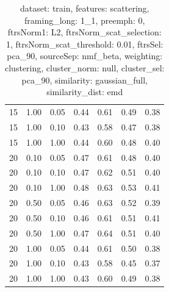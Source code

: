 \documentclass[12pt,a4paper,fleqn]{tufte-handout}
\begin{document}
\begin{table}
\begin{center}
\begin{tabular}{lllcccc}
15 & 1.00 & 0.05 & 0.44 & 0.61 & 0.49 & 0.38 \\   
15 & 1.00 & 0.10 & 0.43 & 0.58 & 0.47 & 0.38 \\   
15 & 1.00 & 1.00 & 0.44 & 0.60 & 0.48 & 0.40 \\   
20 & 0.10 & 0.05 & 0.47 & 0.61 & 0.48 & 0.40 \\   
20 & 0.10 & 0.10 & 0.47 & 0.62 & 0.51 & 0.40 \\   
20 & 0.10 & 1.00 & 0.48 & 0.63 & 0.53 & 0.41 \\   
20 & 0.50 & 0.05 & 0.46 & 0.63 & 0.52 & 0.39 \\   
20 & 0.50 & 0.10 & 0.46 & 0.61 & 0.51 & 0.41 \\   
20 & 0.50 & 1.00 & 0.47 & 0.64 & 0.51 & 0.40 \\   
20 & 1.00 & 0.05 & 0.44 & 0.61 & 0.50 & 0.38 \\   
20 & 1.00 & 0.10 & 0.43 & 0.58 & 0.45 & 0.37 \\   
20 & 1.00 & 1.00 & 0.43 & 0.60 & 0.49 & 0.38 \\   
\end{tabular}   
\end{center}   
\caption{dataset: train, features: scattering, framing\_long: 1\_1, preemph: 0, ftrsNorm1: L2, ftrsNorm\_scat\_selection: 1, ftrsNorm\_scat\_threshold: 0.01, ftrsSel: pca\_90, sourceSep: nmf\_beta, weighting: clustering, cluster\_norm: null, cluster\_sel: pca\_90, similarity: gaussian\_full, similarity\_dist: emd}   
\label{datasetrFeaturscFraminlong1_1Preemp0Ftrsnorm1L2Ftrsnoscatselect1Ftrsnoscatthresh0.01Ftrsselpc90SourcesepnmbeWeightclClustenormnuClusteselpc90SimilagafuSimiladistem}   
\end{table}   
 
\end{document}
